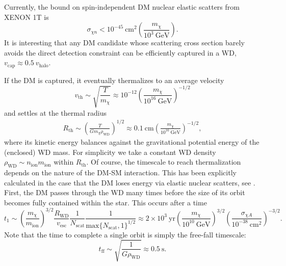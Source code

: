 \documentclass[preprintnumbers,amsmath,amssymb,prd,superscriptaddress]{revtex4}
\newcommand{\GeV}{\text{GeV}}
\newcommand{\cm}{\text{cm}}
\def\r{\right)}
\def\l{\left(}
\begin{document}
Currently, the bound on spin-independent DM nuclear elastic scatters from XENON 1T is
\begin{equation}
\label{eq:xenon}
\sigma_{\chi n} < 10^{-45} ~\text{cm}^2 \l \frac{m_\chi}{10^3 ~\GeV} \r.
\end{equation}
It is interesting that any DM candidate whose scattering cross section barely avoids the direct detection constraint can be efficiently captured in a WD, $v_\text{cap} \approx 0.5 ~v_\text{halo}$. 

If the DM is captured, it eventually thermalizes to an average velocity
\begin{equation}
v_\text{th} \sim \sqrt{\frac{T}{m_\chi}} \approx 10^{-12} \l \frac{m_\chi}{10^{16} ~\GeV}\r^{-1/2}
\end{equation}
and settles at the thermal radius
\begin{align}
R_\text{th} \sim \l \frac{T}{G m_\chi \rho_\text{WD}}\r^{1/2} \approx 0.1 ~\cm \l \frac{m_\chi}{10^{16} ~\GeV}\r^{-1/2},
\end{align}
where its kinetic energy balances against the gravitational potential energy of the (enclosed) WD mass. 
For simplicity we take a constant WD density $\rho_\text{WD} \sim n_\text{ion} m_\text{ion}$ within $R_\text{th}$.
Of course, the timescale to reach thermalization depends on the nature of the DM-SM interaction.
This has been explicitly calculated in the case that the DM loses energy via elastic nuclear scatters, see \cite{Tinyakov}. 
First, the DM passes through the WD many times before the size of its orbit becomes fully contained within the star.
This occurs after a time
\begin{equation}
t_1 \sim \l \frac{m_\chi}{m_\text{ion}} \r^{3/2} \frac{R_\text{WD}}{v_\text{esc}} \frac{1}{N_\text{scat}} \frac{1}{\text{max}\{N_\text{scat}, 1\}^{1/2}} \approx 2 \times 10^{3} ~\text{yr} \l \frac{m_\chi}{10^{10} ~\GeV} \r^{3/2} \l \frac{\sigma_{\chi A}}{10^{-38} ~\cm^2} \r^{-3/2}. 
\end{equation}
Note that the time to complete a single orbit is simply the free-fall timescale:
\begin{equation}
\label{eq:freefalltime}
t_\text{ff} \sim \sqrt{\frac{1}{G \rho_\text{WD}}} \approx 0.5 ~\text{s}.
\end{equation}
\end{document}

